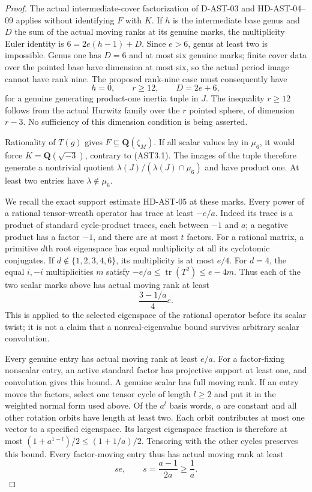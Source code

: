 \begin{proof}
The actual intermediate-cover factorization of D-AST-03 and
HD-AST-04--09 applies without identifying $F$ with $K$.
If $h$ is the intermediate base genus and $D$ the sum of the
actual moving ranks at its genuine marks, the multiplicity Euler
identity is $6=2e(h-1)+D$.  Since $e>6$, genus at least two
is impossible.  Genus one has $D=6$ and at most six genuine
marks; finite cover data over the pointed base have dimension
at most six, so the actual period image cannot have rank nine.
The proposed rank-nine case must consequently have
\[
 h=0,\qquad r\ge12,\qquad D=2e+6,                            \tag{AST3.11}
\]
for a genuine generating product-one inertia tuple in $J$.
The inequality $r\ge12$ follows from the actual Hurwitz family
over the $r$ pointed sphere, of dimension $r-3$.  No sufficiency
of this dimension condition is being asserted.

Rationality of $T(g)$ gives $F\subseteq\mathbf Q(\zeta_M)$.
If all scalar values lay in $\mu_6$, it would force
$K=\mathbf Q(\sqrt{-3})$, contrary to (AST3.1).  The images of
the tuple therefore generate a nontrivial quotient
$\lambda(J)/(\lambda(J)\cap\mu_6)$ and have product one.
At least two entries have $\lambda\notin\mu_6$.

We recall the exact support estimate HD-AST-05 at these marks.
Every power of a rational tensor-wreath operator has trace at
least $-e/a$.  Indeed its trace is a product of standard
cycle-product traces, each between $-1$ and $a$; a negative
product has a factor $-1$, and there are at most $t$ factors.
For a rational matrix, a primitive $d$th root eigenspace has
equal multiplicity at all its cyclotomic conjugates.  If
$d\notin\{1,2,3,4,6\}$, its multiplicity is at most $e/4$.
For $d=4$, the equal $i,-i$ multiplicities $m$ satisfy
$-e/a\le\operatorname{tr}(T^2)\le e-4m$.
Thus each of the two scalar marks above has actual moving rank
at least
\[
                           \frac{3-1/a}{4}e.                  \tag{AST3.12}
\]
This is applied to the selected eigenspace of the rational
operator before its scalar twist; it is not a claim that a
nonreal-eigenvalue bound survives arbitrary scalar convolution.

Every genuine entry has actual moving rank at least $e/a$.
For a factor-fixing nonscalar entry, an active standard factor
has projective support at least one, and convolution gives this
bound.  A genuine scalar has full moving rank.  If an entry moves
the factors, select one tensor cycle of length $l\ge2$ and put
it in the weighted normal form used above.  Of the $a^l$ basis
words, $a$ are constant and all other rotation orbits have length
at least two.  Each orbit contributes at most one vector to a
specified eigenspace.  Its largest eigenspace fraction is therefore
at most $(1+a^{1-l})/2\le(1+1/a)/2$.  Tensoring with the other
cycles preserves this bound.  Every factor-moving entry thus has
actual moving rank at least
\[
                          s e,\qquad s=\frac{a-1}{2a}\ge\frac1a.
                                                                    \tag{AST3.13}
\]


\end{proof}
